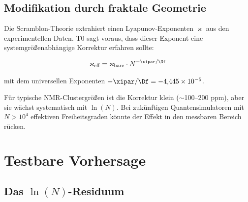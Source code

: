 \subsection{Modifikation durch fraktale Geometrie}

Die Scramblon-Theorie extrahiert einen Lyapunov-Exponenten $\varkappa$ aus den experimentellen Daten. T0 sagt voraus, dass dieser Exponent eine systemgrößenabhängige Korrektur erfahren sollte:

\begin{equation}
	\varkappa_{\text{eff}} = \varkappa_{\text{bare}} \cdot N^{-\xipar/\Df}
	\label{eq:lyapunov_correction}
\end{equation}

mit dem universellen Exponenten $-\xipar/\Df = -4{,}445 \times 10^{-5}$.

\begin{table}[h]
	\centering
	\caption{Vorhergesagte T0-Korrektur des Lyapunov-Exponenten}
	\label{tab:lyapunov}
\end{table}

\begin{remark}
	Für typische NMR-Clustergrößen ist die Korrektur klein ($\sim$100--200 ppm), aber sie wächst systematisch mit $\ln(N)$. Bei zukünftigen Quantensimulatoren mit $N > 10^4$ effektiven Freiheitsgraden könnte der Effekt in den messbaren Bereich rücken.
\end{remark}


\section{Testbare Vorhersage}
\label{sec:prediction}

\subsection{Das $\ln(N)$-Residuum}

